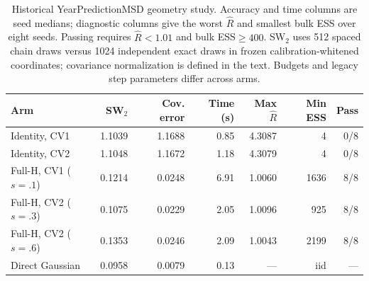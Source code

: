 \begin{table}[tb]
\centering\small
\caption{Historical YearPredictionMSD geometry study. Accuracy and time columns are seed medians; diagnostic columns give the worst $\widehat R$ and smallest bulk ESS over eight seeds. Passing requires $\widehat R<1.01$ and bulk ESS$\geq400$. SW$_2$ uses 512 spaced chain draws versus 1024 independent exact draws in frozen calibration-whitened coordinates; covariance normalization is defined in the text. Budgets and legacy step parameters differ across arms.}\label{tab:year_geometry}
\begin{tabular}{lrrrrrr}
\toprule
Arm & SW$_2$ & Cov. error & Time (s) & Max $\widehat R$ & Min ESS & Pass \\
\midrule
Identity, CV1 & 1.1039 & 1.1688 & 0.85 & 4.3087 & 4 & 0/8 \\
Identity, CV2 & 1.1048 & 1.1672 & 1.18 & 4.3079 & 4 & 0/8 \\
Full-H, CV1 ($s=.1$) & 0.1214 & 0.0248 & 6.91 & 1.0060 & 1636 & 8/8 \\
Full-H, CV2 ($s=.3$) & 0.1075 & 0.0229 & 2.05 & 1.0096 & 925 & 8/8 \\
Full-H, CV2 ($s=.6$) & 0.1353 & 0.0246 & 2.09 & 1.0043 & 2199 & 8/8 \\
Direct Gaussian & 0.0958 & 0.0079 & 0.13 & --- & iid & --- \\
\bottomrule
\end{tabular}
\end{table}
